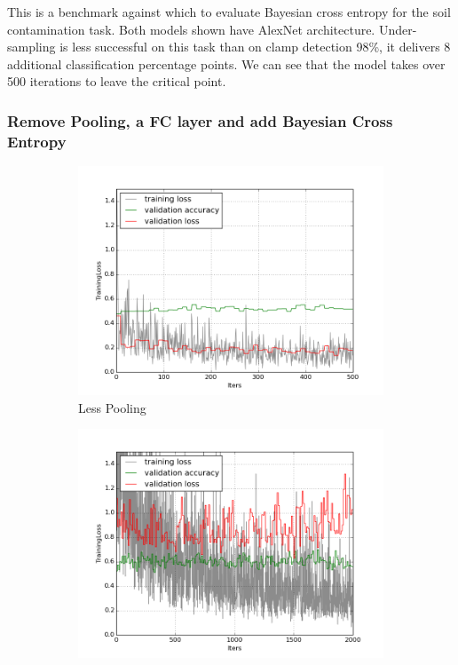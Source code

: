 \documentclass[a4paper,11pt]{article}
\begin{document}
This is a benchmark against which to evaluate Bayesian cross entropy for the soil contamination task. Both models shown have AlexNet architecture. Under-sampling is less successful on this task than on clamp detection 98\%, it delivers 8 additional classification percentage points. We can see that the model takes over 500 iterations to leave the critical point. 

\subsubsection{Remove Pooling, a FC layer and add Bayesian Cross Entropy}
\begin{figure}
    \centering
    \begin{minipage}[b]{\textwidth}
      \begin{subfigure}{.5\textwidth} 
        \centering
        \includegraphics[scale=0.4]{images/plot_soil_contam_nopool_sl.png}
        \caption{Less Pooling}\label{fig:2a}
      \end{subfigure}%
      \begin{subfigure}{.5\textwidth} 
        \centering
        \includegraphics[scale=0.4]{images/plot_soil_contam_nopool.png}

\end{subfigure}
\end{minipage}
\end{figure}
\end{document}
